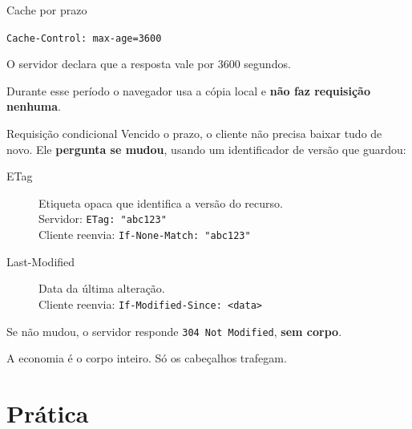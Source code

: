 \documentclass{beamer}
\begin{document}

\begin{frame}{Cache por prazo}
  \begin{center}
    \large \texttt{Cache-Control: max-age=3600}
  \end{center}

  \vspace{0.5cm}
  O servidor declara que a resposta vale por 3600 segundos.

  \vspace{0.4cm}
  Durante esse período o navegador usa a cópia local e \textbf{não faz
  requisição nenhuma}.
\end{frame}

\begin{frame}{Requisição condicional}
  Vencido o prazo, o cliente não precisa baixar tudo de novo. Ele
  \textbf{pergunta se mudou}, usando um identificador de versão que guardou:

  \begin{description}
    \item[ETag] Etiqueta opaca que identifica a versão do recurso. \\
      Servidor: \texttt{ETag: "abc123"} \\
      Cliente reenvia: \texttt{If-None-Match: "abc123"}
    \item[Last-Modified] Data da última alteração. \\
      Cliente reenvia: \texttt{If-Modified-Since: <data>}
  \end{description}

  \vspace{0.4cm}
  Se não mudou, o servidor responde \texttt{304 Not Modified},
  \textbf{sem corpo}.

  \vspace{0.2cm}
  A economia é o corpo inteiro. Só os cabeçalhos trafegam.
\end{frame}

\section{Prática}
\end{document}

